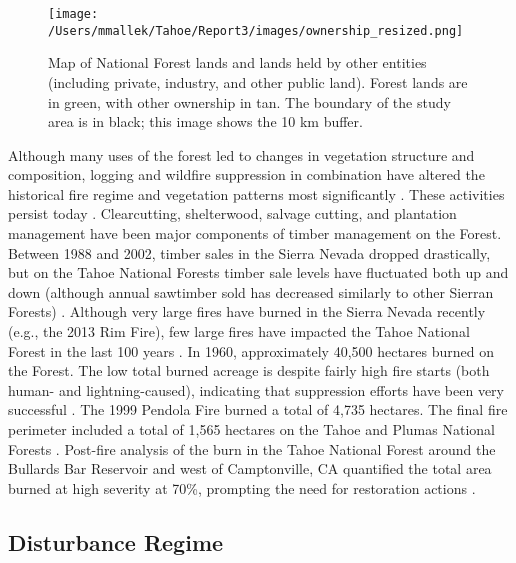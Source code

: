 \begin{figure}[!htbp]
\centering
\texttt{[image: /Users/mmallek/Tahoe/Report3/images/ownership\_resized.png]}
\caption{Map of National Forest lands and lands held by other entities (including private, industry, and other public land). Forest lands are in green, with other ownership in tan. The boundary of the study area is in black; this image shows the 10 km buffer.} 
\label{ownership}
\end{figure}

Although many uses of the forest led to changes in vegetation structure and composition, logging and wildfire suppression in combination have altered the historical fire regime and vegetation patterns most significantly \citep{Storer1963,Stephens2015,Knapp2013,Hessburg2005}. These activities persist today \citep{USDAForestService2014}. Clearcutting, shelterwood, salvage cutting, and plantation management have been major components of timber management on the Forest. Between 1988 and 2002, timber sales in the Sierra Nevada dropped drastically, but on the Tahoe National Forests timber sale levels have fluctuated both up and down (although annual sawtimber sold has decreased similarly to other Sierran Forests) \citep{USDAForestService2004}. Although very large fires have burned in the Sierra Nevada recently (e.g., the 2013 Rim Fire), few large fires have impacted the Tahoe National Forest in the last 100 years \citep{USDAForestService1990}. In 1960, approximately 40,500 hectares burned on the Forest. The low total burned acreage is despite fairly high fire starts (both human- and lightning-caused), indicating that suppression efforts have been very successful \citep{USDAForestService1990}. The 1999 Pendola Fire burned a total of 4,735 hectares. The final fire perimeter included a total of 1,565 hectares on the Tahoe and Plumas National Forests \citep{Shaw2009,USDOJ2009}. Post-fire analysis of the burn in the Tahoe National Forest around the Bullards Bar Reservoir and west of Camptonville, CA quantified the total area burned at high severity at 70\%, prompting the need for restoration actions \citep{USDAForestService1999}. 






\subsection{Disturbance Regime}
